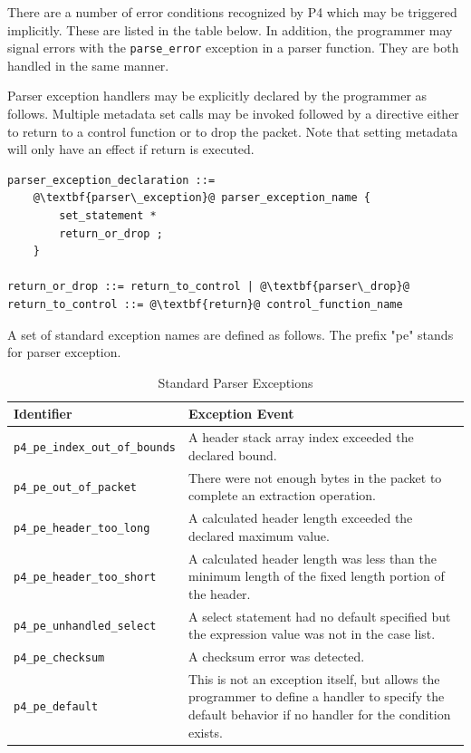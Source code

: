 \documentclass[12pt]{article}
\begin{document}
There are a number of error conditions recognized by P4 which may be triggered 
implicitly. These are listed in the table below. In addition, the programmer 
may signal errors with the \texttt{parse_error} exception in a parser function. They 
are both handled in the same manner.

Parser exception handlers may be explicitly declared by the programmer as 
follows. Multiple metadata set calls may be invoked followed by a directive 
either to return to a control function or to drop the packet. Note that setting 
metadata will only have an effect if return is executed.

\begin{lstlisting}[frame=single,backgroundcolor=\color{bnfgreen},escapechar=\@]
parser_exception_declaration ::=
    @\textbf{parser\_exception}@ parser_exception_name {
        set_statement *
        return_or_drop ;
    }

return_or_drop ::= return_to_control | @\textbf{parser\_drop}@
return_to_control ::= @\textbf{return}@ control_function_name
\end{lstlisting}



A set of standard exception names are defined as follows.  The prefix "pe" 
stands for parser exception.

\begin{table}[H]
\begin{center}
\begin{tabular}{| l | p{} |} \hline
\textbf{Identifier} &
\textbf{Exception Event} \\ \hline
\texttt{p4_pe_index_out_of_bounds} &
A header stack array index exceeded the declared bound. \\ \hline
\texttt{p4_pe_out_of_packet} &
There were not enough bytes in the packet to complete an extraction operation. \\ \hline
\texttt{p4_pe_header_too_long} &
A calculated header length exceeded the declared maximum value. \\ \hline
\texttt{p4_pe_header_too_short} &
A calculated header length was less than the minimum length of the fixed length 
portion of the header. \\ \hline
\texttt{p4_pe_unhandled_select} &
A select statement had no default specified but the expression value was not 
in the case list. \\ \hline
\texttt{p4_pe_checksum} &
A checksum error was detected. \\ \hline
\texttt{p4_pe_default} &
This is not an exception itself, but allows the programmer to define a handler 
to specify the default behavior if no handler for the condition exists. \\
\hline
\end{tabular}
\end{center}
\caption{Standard Parser Exceptions}
\label{tab:parserexceptions}
\end{table}
\end{document}

